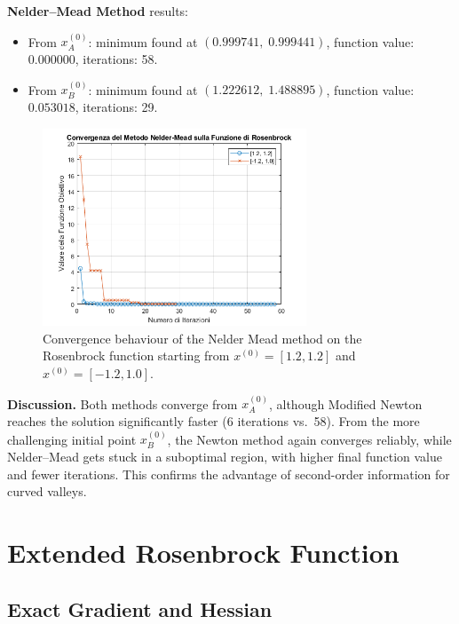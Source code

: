 \documentclass[a4paper,12pt]{article}
\begin{document}
	\newpage
	\vspace{1em}
	\textbf{Nelder–Mead Method} results:
	\begin{itemize}
		\item From \( x^{(0)}_A \):  
		minimum found at \( (0.999741,\;0.999441) \),  
		function value: \( 0.000000 \),  
		iterations: 58.
		\item From \( x^{(0)}_B \):  
		minimum found at \( (1.222612,\;1.488895) \),  
		function value: \( 0.053018 \),  
		iterations: 29.
	\end{itemize}
	
	\begin{figure}[htbp]
		\centering
		\includegraphics[width=0.7\textwidth]{../immagini/grafrosennelder.png}
		\caption{Convergence behaviour of the Nelder Mead method on the Rosenbrock function starting from $x^{(0)} = [1.2, 1.2]$ and $x^{(0)} = [-1.2, 1.0]$.}
		\label{fig:rosennewton}
	\end{figure}
	
	\vspace{1em}
	
	
	\vspace{1em}
	\textbf{Discussion.}  
	Both methods converge from \( x^{(0)}_A \), although Modified Newton reaches the solution significantly faster (6 iterations vs.\ 58). From the more challenging initial point \( x^{(0)}_B \), the Newton method again converges reliably, while Nelder–Mead gets stuck in a suboptimal region, with higher final function value and fewer iterations. This confirms the advantage of second-order information for curved valleys.
	
	 
	
	\section{Extended Rosenbrock Function}
	\subsection{Exact Gradient and Hessian}
\end{document}
